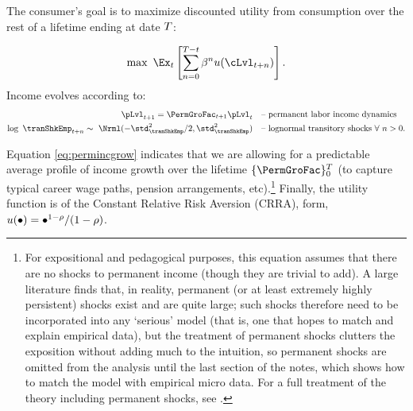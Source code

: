 The consumer's goal is to maximize discounted utility from consumption over the rest of a lifetime ending at date $T$:


  \begin{equation}\label{eq:MaxProb}
    \max~\Ex_{\prd}\left[\sum_{n=0}^{\trmT-\prd}\DiscFac^{n} \uFunc(\cLvl_{\prd+n})\right].
  \end{equation}
Income evolves according to:
  \begin{equation}\begin{gathered}\begin{aligned}
        \pLvl_{\prd+1}   = \PermGroFac_{\prd+1}\pLvl_{\prd}                                        & \text{~~ -- permanent labor income dynamics} \label{eq:permincgrow}
        \\ \log ~ \tranShkEmp_{t+n}  \sim ~\Nrml(-\std_{\tranShkEmp}^{2}/2,\std_{\tranShkEmp}^{2}) & \text{~~ -- lognormal transitory shocks}~\forall~n>0 .
      \end{aligned}\end{gathered}\end{equation}

Equation \eqref{eq:permincgrow} indicates that we are allowing for a predictable average profile of income growth over the lifetime $\{\PermGroFac\}_{0}^{T}$ (to capture typical career wage paths, pension arrangements, etc).\footnote{For expositional and pedagogical purposes, this equation assumes that there are no shocks to permanent income (though they are trivial to add).  A large literature finds that, in reality, permanent (or at least extremely highly persistent) shocks exist and are quite large; such shocks therefore need to be incorporated into any `serious' model (that is, one that hopes to match and explain empirical data), but the treatment of permanent shocks clutters the exposition without adding much to the intuition, so permanent shocks are omitted from the analysis until the last section of the notes, which shows how to match the model with empirical micro data.  For a full treatment of the theory including permanent shocks, see \cite{BufferStockTheory}.}  Finally, the utility function is of the Constant Relative Risk Aversion (CRRA), form, $u(\bullet) = \bullet^{1-\rho}/(1-\rho)$.

